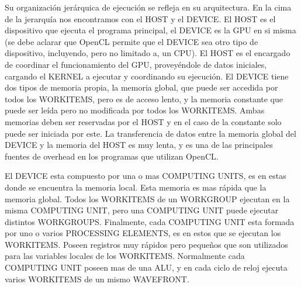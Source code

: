 Su organización jerárquica de ejecución se refleja en su arquitectura. En la
cima de la jerarquía nos encontramos con el HOST y el DEVICE. El HOST es el
dispositivo que ejecuta el programa principal, el DEVICE es la GPU en si misma
(se debe aclarar que OpenCL permite que el DEVICE sea otro tipo de dispositivo,
incluyendo, pero no limitado a, un CPU). El HOST es el encargado de coordinar el
funcionamiento del GPU, proveyéndole de datos iniciales, cargando el KERNEL a
ejecutar y coordinando su ejecución. El DEVICE tiene dos tipos de memoria propia,
la memoria global, que puede ser accedida por todos los WORKITEMS, pero es de
acceso lento, y la memoria constante que puede ser leída pero no modificada por
todos los WORKITEMS. Ambas memorias deben ser reservadas por el HOST y en el
caso de la constante solo puede ser iniciada por este. La transferencia de datos
entre la memoria global del DEVICE y la memoria del HOST es muy lenta, y es una
de las principales fuentes de overhead en los programas que utilizan OpenCL.

El DEVICE esta compuesto por una o mas COMPUTING UNITS, es en estas donde se
encuentra la memoria local. Esta memoria es mas rápida que la memoria global.
Todos los WORKITEMS de un WORKGROUP ejecutan en la misma COMPUTING UNIT, pero
una COMPUTING UNIT puede ejecutar distintos WORKGROUPS. Finalmente, cada
COMPUTING UNIT esta formada por uno o varios PROCESSING ELEMENTS, es en estos
que se ejecutan los WORKITEMS. Poseen registros muy rápidos pero pequeños que
son utilizados para las variables locales de los WORKITEMS. Normalmente cada
COMPUTING UNIT poseen mas de una ALU, y en cada ciclo de reloj ejecuta varios
WORKITEMS de un mismo WAVEFRONT.

